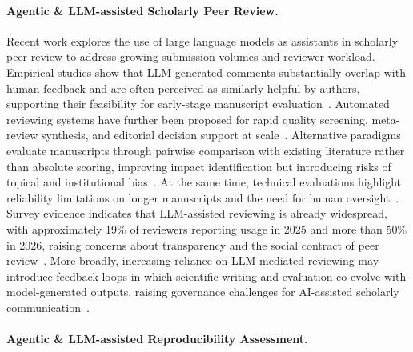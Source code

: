 \documentclass{article}
\begin{document}
\paragraph{Agentic \& LLM-assisted Scholarly Peer Review.}
Recent work explores the use of large language models as assistants in scholarly peer review to address growing submission volumes and reviewer workload. 
Empirical studies show that LLM-generated comments substantially overlap with human feedback and are often perceived as similarly helpful by authors, supporting their feasibility for early-stage manuscript evaluation~\citep{liang2024can}. 
Automated reviewing systems have further been proposed for rapid quality screening, meta-review synthesis, and editorial decision support at scale~\citep{tyser2024ai,hossain2025llms}. 
Alternative paradigms evaluate manuscripts through pairwise comparison with existing literature rather than absolute scoring, improving impact identification but introducing risks of topical and institutional bias~\citep{zhang2025replication}. 
At the same time, technical evaluations highlight reliability limitations on longer manuscripts and the need for human oversight~\citep{zhou2024llm}. 
Survey evidence indicates that LLM-assisted reviewing is already widespread, with approximately 19\% of reviewers reporting usage in 2025 and more than 50\% in 2026, raising concerns about transparency and the social contract of peer review~\citep{naddaf2025ai,naddaf2026more}. 
More broadly, increasing reliance on LLM-mediated reviewing may introduce feedback loops in which scientific writing and evaluation co-evolve with model-generated outputs, raising governance challenges for AI-assisted scholarly communication~\citep{zhuang2025large}.

\paragraph{Agentic \& LLM-assisted Reproducibility Assessment.}
\end{document}
